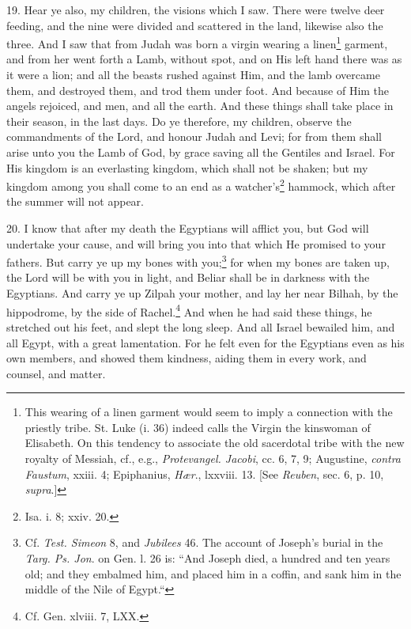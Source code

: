 19. Hear ye also, my children, the visions which I saw. There were twelve deer feeding, and the nine were divided and scattered in the land, likewise also the three. And I saw that from Judah was born a virgin wearing a linen\footnote{This wearing of a linen garment would seem to imply a connection with the priestly tribe. St. Luke (i. 36) indeed calls the Virgin the kinswoman of Elisabeth. On this tendency to associate the old sacerdotal tribe with the new royalty of Messiah, cf., e.g., \emph{Protevangel. Jacobi}, cc. 6, 7, 9; Augustine, \emph{contra Faustum}, xxiii. 4; Epiphanius, \emph{Hær}., lxxviii. 13. [See \emph{Reuben}, sec. 6, p. 10, \emph{supra}.]} garment, and from her went forth a Lamb, without spot, and on His left hand there was as it were a lion; and all the beasts rushed against Him, and the lamb overcame them, and destroyed them, and trod them under foot. And because of Him the angels rejoiced, and men, and all the earth. And these things shall take place in their season, in the last days. Do ye therefore, my children, observe the commandments of the Lord, and honour Judah and Levi; for from them shall arise unto you the Lamb of God, by grace saving all the Gentiles and Israel. For His kingdom is an everlasting kingdom, which shall not be shaken; but my kingdom among you shall come to an end as a watcher’s\footnote{Isa. i. 8; xxiv. 20.} hammock, which after the summer will not appear.

20. I know that after my death the Egyptians will afflict you, but God will undertake your cause, and will bring you into that which He promised to your fathers. But carry ye up my bones with you;\footnote{Cf. \emph{Test. Simeon} 8, and \emph{Jubilees} 46. The account of Joseph’s burial in the \emph{Targ. Ps. Jon}. on Gen. l. 26 is: “And Joseph died, a hundred and ten years old; and they embalmed him, and placed him in a coffin, and sank him in the middle of the Nile of Egypt.“} for when my bones are taken up, the Lord will be with you in light, and Beliar shall be in darkness with the Egyptians. And carry ye up Zilpah your mother, and lay her near Bilhah, by the hippodrome, by the side of Rachel.\footnote{Cf. Gen. xlviii. 7, LXX.} And when he had said these things, he stretched out his feet, and slept the long sleep. And all Israel bewailed him, and all Egypt, with a great lamentation. For he felt even for the Egyptians even as his own members, and showed them kindness, aiding them in every work, and counsel, and matter.



